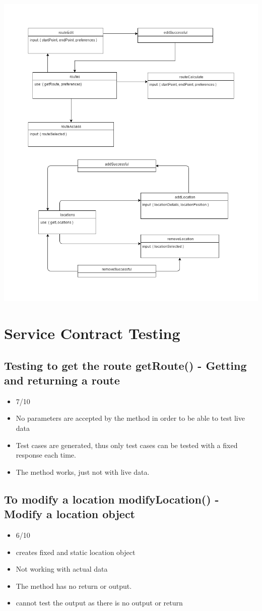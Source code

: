 \documentclass[12pt]{article}
\begin{document}
\includegraphics[scale=0.5]{diagrams/testModel.png}

\section{Service Contract Testing}

\subsection {Testing to get the route getRoute() - Getting and returning a route}
\begin{itemize}
\item 7/10
\item No parameters are accepted by the method in order to be able to test live data 
\item Test cases are generated, thus only test cases can be tested with a fixed response each time.
\item The method works, just not with live data.
\end{itemize}

\subsection{To modify a location modifyLocation() - Modify a location object}
\begin{itemize}
\item6/10
\item creates fixed and static location object
\item Not working with actual data
\item The method has no return or output. 
\item cannot test the output as there is no output or return
\end{itemize}
\end{document}
